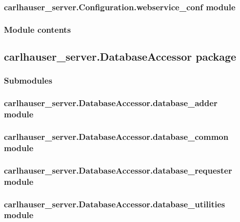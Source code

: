 \documentclass[letterpaper,10pt,english]{sphinxmanual}
\begin{document}
\subsubsection{carlhauser\_server.Configuration.webservice\_conf module}
\label{\detokenize{carlhauser_server.Configuration:carlhauser-server-configuration-webservice-conf-module}}

\subsubsection{Module contents}
\label{\detokenize{carlhauser_server.Configuration:module-contents}}

\subsection{carlhauser\_server.DatabaseAccessor package}
\label{\detokenize{carlhauser_server.DatabaseAccessor:carlhauser-server-databaseaccessor-package}}\label{\detokenize{carlhauser_server.DatabaseAccessor::doc}}

\subsubsection{Submodules}
\label{\detokenize{carlhauser_server.DatabaseAccessor:submodules}}

\subsubsection{carlhauser\_server.DatabaseAccessor.database\_adder module}
\label{\detokenize{carlhauser_server.DatabaseAccessor:carlhauser-server-databaseaccessor-database-adder-module}}

\subsubsection{carlhauser\_server.DatabaseAccessor.database\_common module}
\label{\detokenize{carlhauser_server.DatabaseAccessor:carlhauser-server-databaseaccessor-database-common-module}}

\subsubsection{carlhauser\_server.DatabaseAccessor.database\_requester module}
\label{\detokenize{carlhauser_server.DatabaseAccessor:carlhauser-server-databaseaccessor-database-requester-module}}

\subsubsection{carlhauser\_server.DatabaseAccessor.database\_utilities module}
\label{\detokenize{carlhauser_server.DatabaseAccessor:carlhauser-server-databaseaccessor-database-utilities-module}}
\end{document}
